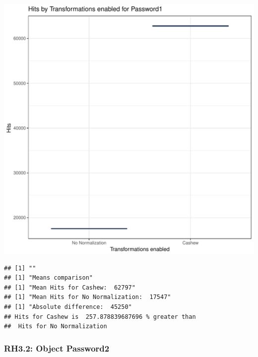 \documentclass{article}\usepackage[]{graphicx}\usepackage[]{color}
\makeatletter
\def\maxwidth{ %
  \ifdim\Gin@nat@width>\linewidth
    \linewidth
  \else
    \Gin@nat@width
  \fi
}
\newenvironment{kframe}{%
 \def\at@end@of@kframe{}%
 \ifinner\ifhmode%
  \def\at@end@of@kframe{\end{minipage}}%
  \begin{minipage}{\columnwidth}%
 \fi\fi%
 \def\FrameCommand##1{\hskip\@totalleftmargin \hskip-\fboxsep
 \colorbox{shadecolor}{##1}\hskip-\fboxsep
     \hskip-\linewidth \hskip-\@totalleftmargin \hskip\columnwidth}%
 \MakeFramed {\advance\hsize-\width
   \@totalleftmargin\z@ \linewidth\hsize
   \@setminipage}}%
 {\par\unskip\endMakeFramed%
 \at@end@of@kframe}
\newenvironment{knitrout}{}{} %
\makeatother
\begin{document}
\begin{knitrout}
\color{fgcolor}
\includegraphics[width=\maxwidth]{figure/RH3_password-1} 
\begin{kframe}

{\ttfamily\noindent\bfseries\color{errorcolor}{\#\# Error in eval(expr, envir, enclos): object 'shap\_cashew\_password' not found}}\begin{verbatim}
## [1] ""
## [1] "Means comparison"
## [1] "Mean Hits for Cashew:  62797"
## [1] "Mean Hits for No Normalization:  17547"
## [1] "Absolute difference:  45250"
## Hits for Cashew is  257.878839687696 % greater than 
##  Hits for No Normalization
\end{verbatim}
\end{kframe}
\end{knitrout}


\subsubsection{RH3.2: Object Password2}
\end{document}
